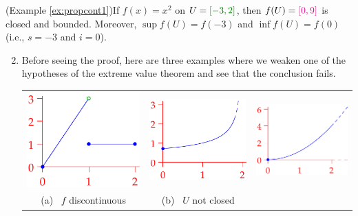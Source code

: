 \begin{examples}{}{}
	\exstart (Example \ref{ex:propcont1})\lstsp If $f(x)=x^2$ on $U=\textcolor{Green}{[-3,2]}$, then $f(U)=\textcolor{magenta}{[0,9]}$ is closed and bounded. Moreover, $\sup f(U)=f(-3)$ and $\inf f(U)=f(0)$ (i.e., $s=-3$ and $i=0$).
	\begin{enumerate}\setcounter{enumi}{1}
	  \item Before seeing the proof, here are three examples where we weaken one of the hypotheses of the extreme value theorem and see that the conclusion fails.
		\begin{center}
		\begin{tabular}{c@{\qquad}c@{\qquad}c}
			\includegraphics[scale=0.95]{extreme2}
			&
			\includegraphics[scale=0.95]{extreme3}
			&
			\includegraphics[scale=0.95]{extreme4}
			\\
			(a) \ $f$ discontinuous
			&
			(b) \ $U$ not closed

\end{tabular}
\end{center}
\end{enumerate}
\end{examples}
